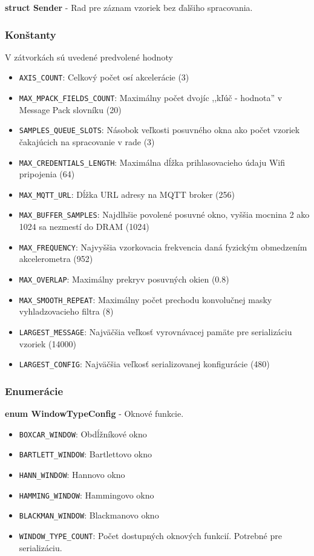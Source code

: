 \noindent\textbf{struct Sender} - Rad pre záznam vzoriek bez ďalšiho spracovania.
\bigbreak

\subsubsection*{Konštanty}
V zátvorkách sú uvedené predvolené hodnoty
\begin{itemize}[noitemsep, topsep=0pt]
	\item \verb|AXIS_COUNT|: Celkový počet osí akcelerácie (3)
	\item \verb|MAX_MPACK_FIELDS_COUNT|: Maximálny počet dvojíc ,,kľúč - hodnota'' v Message Pack slovníku (20)
	\item \verb|SAMPLES_QUEUE_SLOTS|: Násobok veľkosti posuvného okna ako počet vzoriek čakajúcich na spracovanie v rade (3)
	\item \verb|MAX_CREDENTIALS_LENGTH|: Maximálna dĺžka prihlasovacieho údaju Wifi pripojenia (64)
	\item \verb|MAX_MQTT_URL|: Dĺžka URL adresy na MQTT broker (256)
	\item \verb|MAX_BUFFER_SAMPLES|: Najdlhšie povolené posuvné okno, vyššia mocnina 2 ako 1024 sa nezmestí do DRAM (1024)
	\item \verb|MAX_FREQUENCY|: Najvyššia vzorkovacia frekvencia daná fyzickým obmedzením akcelerometra (952)
	\item \verb|MAX_OVERLAP|:  Maximálny prekryv posuvných okien (0.8)
	\item \verb|MAX_SMOOTH_REPEAT|:  Maximálny počet prechodu konvolučnej masky vyhladzovacieho filtra (8)
	\item \verb|LARGEST_MESSAGE|: Najväčšia veľkosť vyrovnávacej pamäte pre serializáciu vzoriek (14000)
	\item \verb|LARGEST_CONFIG|: Najväčšia veľkosť serializovanej konfigurácie (480)
\end{itemize}


\subsubsection*{Enumerácie}
\noindent\textbf{enum WindowTypeConfig} - Oknové funkcie.
	\begin{itemize}[noitemsep, topsep=0pt]
		\item \verb|BOXCAR_WINDOW|: Obdĺžníkové okno
		\item \verb|BARTLETT_WINDOW|: Bartlettovo okno
		\item \verb|HANN_WINDOW|: Hannovo okno
		\item \verb|HAMMING_WINDOW|: Hammingovo okno
		\item \verb|BLACKMAN_WINDOW|: Blackmanovo okno
		\item \verb|WINDOW_TYPE_COUNT|: Počet dostupných oknových funkcií. Potrebné pre serializáciu.
	\end{itemize}
\bigbreak

